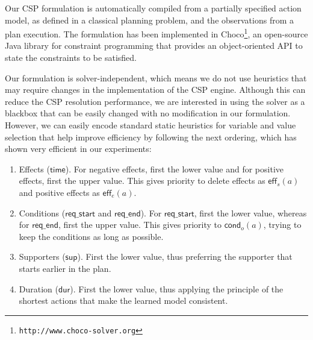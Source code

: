 \documentclass[runningheads]{llncs}
\newcommand{\eff}{\mathsf{eff}}    %
\newcommand{\cond}{\mathsf{cond}}  %
\newcommand{\dur}{\mathsf{dur}}    %
\newcommand{\supp}{\mathsf{sup}}   %
\newcommand{\tim}{\mathsf{time}}   %
\newcommand{\reqs}{\mathsf{req\_{start}}} %
\newcommand{\reqe}{\mathsf{req\_{end}}}   %
\begin{document}
Our CSP formulation is automatically compiled from a partially specified action model, as defined in a classical planning problem, and the observations from a plan execution.
The formulation has been implemented in \textsf{Choco}\footnote{\texttt{http://www.choco-solver.org}}, an open-source Java library for constraint programming that provides an object-oriented API to state the constraints to be satisfied.

Our formulation is solver-independent, which means we do not use heuristics that may require changes in the implementation of the CSP engine.
Although this can reduce the CSP resolution performance, we are interested in using the solver as a blackbox that can be easily changed with no modification in our formulation. However, we can easily encode standard static heuristics for variable and value selection that help improve efficiency by following the next ordering, which has shown very efficient in our experiments:



\begin{enumerate}
  \item Effects ($\tim$). For negative effects, first the lower value and for positive effects, first the upper value. This gives priority to delete effects as $\eff_s(a)$ and positive effects as $\eff_e(a)$.
  \item Conditions ($\reqs$ and $\reqe$). For $\reqs$, first the lower value, whereas for $\reqe$, first the upper value. This gives priority to $\cond_o(a)$, trying to keep the conditions as long as possible.
  \item Supporters ($\supp$). First the lower value, thus preferring the supporter that starts earlier in the plan.
  \item Duration ($\dur$). First the lower value, thus applying the principle of the shortest actions that make the learned model consistent.
\end{enumerate}


\end{document}
